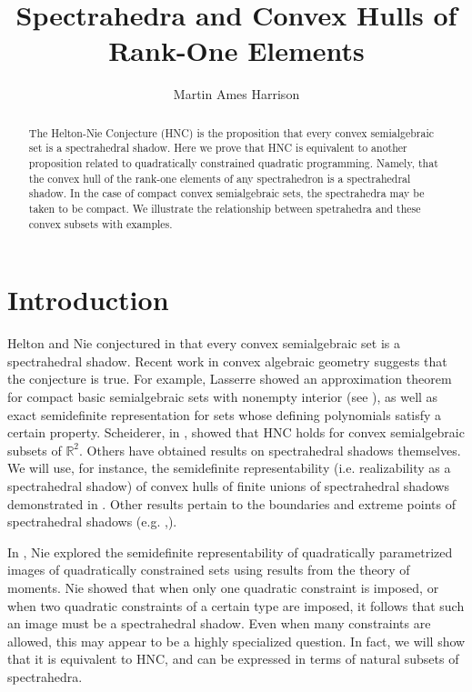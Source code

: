 \documentclass[11pt]{article} %
\title{Spectrahedra and Convex Hulls of Rank-One Elements}
\author{Martin Ames Harrison}
\date{}
\newcommand{\R}{\mathbb{R}}
\begin{document}
\clearpage\maketitle
\thispagestyle{plain}
\begin{abstract}
\noindent The Helton-Nie Conjecture (HNC) is the proposition that every convex semialgebraic set is a spectrahedral shadow. Here we prove that HNC is equivalent to another proposition related to quadratically constrained quadratic programming. Namely, that the convex hull of the rank-one elements of any spectrahedron is a spectrahedral shadow. In the case of compact convex semialgebraic sets, the spectrahedra may be taken to be compact. We illustrate the relationship between spetrahedra and these convex subsets with examples. 
\end{abstract}
\section{Introduction}
Helton and Nie conjectured in \cite{HeltSuff} that every convex semialgebraic set is a spectrahedral shadow. Recent work in convex algebraic geometry suggests that the conjecture is true. For example, Lasserre showed an approximation theorem for compact basic semialgebraic sets with nonempty interior (see \cite{LassPolar}), as well as exact semidefinite representation for sets whose defining polynomials satisfy a certain property. Scheiderer, in \cite{ClausHNC}, showed that HNC holds for convex semialgebraic subsets of $\R^2$. Others have obtained results on spectrahedral shadows themselves. We will use, for instance, the semidefinite representability (i.e. realizability as a spectrahedral shadow) of convex hulls of finite unions of spectrahedral shadows demonstrated in \cite{NetzerSinn}. Other results pertain to the boundaries and extreme points of spectrahedral shadows (e.g. \cite{NetzPlaumSchw},\cite{Rainer2}).  

In \cite{NieQC}, Nie explored the semidefinite representability of quadratically parametrized images of quadratically constrained sets using results from the theory of moments. Nie showed that when only one quadratic constraint is imposed, or when two quadratic constraints of a certain type are imposed, it follows that such an image must be a spectrahedral shadow. Even when many constraints are allowed, this may appear to be a highly specialized question. In fact, we will show that it is equivalent to HNC, and can be expressed in terms of natural subsets of spectrahedra. 
\end{document}
